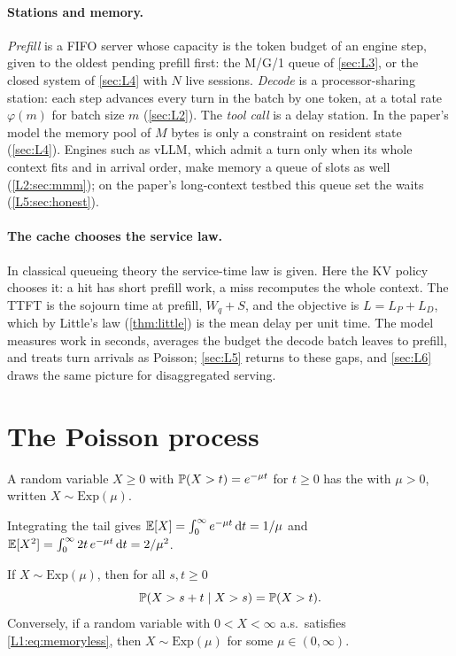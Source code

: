 \paragraph{Stations and memory.} \emph{Prefill} is a FIFO server whose capacity is the
token budget of an engine step, given to the oldest pending prefill first: the M/G/1
queue of \cref{sec:L3}, or the closed system of \cref{sec:L4} with $N$ live sessions.
\emph{Decode} is a processor-sharing station: each step advances every turn in the batch
by one token, at a total rate $\varphi(m)$ for batch size $m$ (\cref{sec:L2}). The
\emph{tool call} is a delay station. In the paper's model the memory pool of $M$ bytes
is only a constraint on resident state (\cref{sec:L4}). Engines such as vLLM, which
admit a turn only when its whole context fits and in arrival order, make memory a queue
of slots as well (\cref{L2:sec:mmm}); on the paper's long-context testbed this queue set
the waits (\cref{L5:sec:honest}).

\paragraph{The cache chooses the service law.} In classical queueing theory the
service-time law is given. Here the KV policy chooses it: a hit has short prefill work,
a miss recomputes the whole context. The TTFT is the sojourn time at prefill,
$W_q+S$, and the objective is $L=L_P+L_D$, which by Little's law (\cref{thm:little}) is
the mean delay per unit time. The model measures work in seconds, averages the
budget the decode batch leaves to prefill, and treats turn arrivals as Poisson;
\cref{sec:L5} returns to these gaps, and \cref{sec:L6} draws the same picture for
disaggregated serving.

\section{The Poisson process}

\begin{definition}\label{L1:def:exp}
A random variable $X\ge0$ with $\mathbb{P}(X>t)=e^{-\mu t}$ for $t\ge0$ has the
 with  $\mu>0$, written
$X\sim\mathrm{Exp}(\mu)$.
\end{definition}

Integrating the tail gives $\mathbb{E}[X]=\int_0^\infty e^{-\mu t}\,\mathrm{d} t=1/\mu$ and
$\mathbb{E}[X^2]=\int_0^\infty 2t\,e^{-\mu t}\,\mathrm{d} t=2/\mu^2$.

\begin{proposition}\label{prop:memoryless}
If $X\sim\mathrm{Exp}(\mu)$, then for all $s,t\ge0$
\begin{equation}\label{L1:eq:memoryless}
  \mathbb{P}(X>s+t\mid X>s)=\mathbb{P}(X>t).
\end{equation}
Conversely, if a random variable with $0<X<\infty$ a.s.\ satisfies
\eqref{L1:eq:memoryless}, then $X\sim\mathrm{Exp}(\mu)$ for some $\mu\in(0,\infty)$.
\end{proposition}


